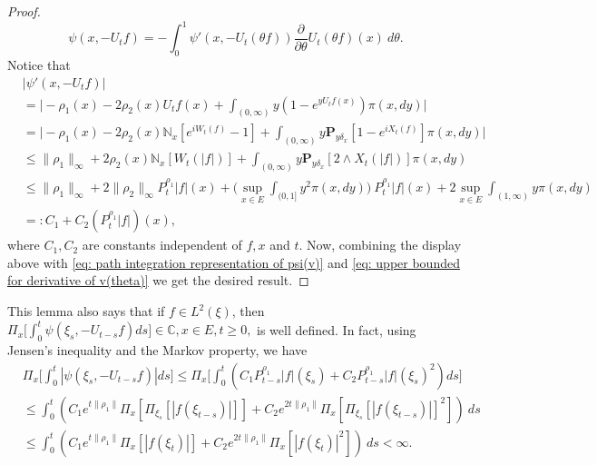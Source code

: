 \documentclass[EJP]{ejpecp} %
\begin{document}
\begin{proof}
\begin{equation}
\label{eq: path integration representation of psi(v)}
    \psi(x,-U_tf)
    = -\int_0^1 \psi' (x,-U_t(\theta f) ) \frac{\partial}{\partial \theta} U_t(\theta f)(x)~d\theta.
\end{equation}
	Notice that
\begin{align}
    & |\psi'(x, -U_tf)| \\
    & = \Big| -\rho_1(x)- 2\rho_2(x) U_tf(x)+ \int_{(0,\infty)} y (1- e^{y U_tf(x)} ) \pi(x,dy)\Big| \\
    & = \Big| - \rho_1(x)- 2\rho_2(x)\mathbb N_x[e^{i W_t(f)} - 1]  + \int_{(0,\infty)} y \mathbf P_{y \delta_x}[1-e^{i X_t(f)}] \pi(x,dy) \Big| \\
    & \leq \|\rho_1\|_\infty + 2\rho_2(x)\mathbb N_x[W_t(|f|)]+ \int_{(0,\infty)} y\mathbf P_{y\delta_x}[2\wedge X_t(|f|)] \pi(x,dy) \\
    & \leq \|\rho_1\|_\infty + 2\|\rho_2\|_\infty P^{\rho_1}_t |f|(x) + \Big(\sup_{x\in E}\int_{(0,1]}y^2 \pi(x,dy)\Big)~P^{\rho_1}_t |f|(x) + 2\sup_{x\in E}\int_{(1,\infty)} y \pi(x,dy) \\
    & =: C_1 + C_2(P^{\rho_1}_t |f|)(x), \label{eq: upper bound of psi'(v)}
\end{align}
	where $C_1, C_2$ are constants independent of $f,x$ and $t$.
	Now, combining the display above with \eqref{eq: path integration representation of psi(v)} and \eqref{eq: upper bounded for derivative of v(theta)} we get the desired result.
\end{proof}

	This lemma also says that if $f\in L^2(\xi)$, then $\Pi_x\Big[\int_0^t \psi(\xi_s,- U_{t-s}f)ds\Big] \in \mathbb C, x\in E, t\geq 0,$ is well defined.
	In fact, using Jensen's inequality and the Markov property, we have
\begin{align}
\label{eq: domination of psi(v)}
  	& \Pi_x\Big[\int_0^t |\psi (\xi_s,-U_{t-s}f )|ds\Big]
  	\leq \Pi_x\Big[\int_0^t (C_1 P_{t-s}^{\rho_1}|f|(\xi_s)+C_2 P_{t-s}^{\rho_1}|f|(\xi_s)^2 )ds\Big] \\
  	& \leq \int_0^t (C_1 e^{t\|\rho_1\|}\Pi_x [ \Pi_{\xi_s}[|f(\xi_{t-s})|] ]+C_2 e^{2t\|\rho_1\|}\Pi_x [ \Pi_{\xi_s}[|f (\xi_{t-s})|]^2 ] )~ds \\
  	& \leq \int_0^t (C_1 e^{t\|\rho_1\|}\Pi_x [ |f(\xi_{t})|]+C_2e^{2t\|\rho_1\|}\Pi_x [ |f (\xi_{t})|^2 ])~ds < \infty.
\end{align}
\end{document}
